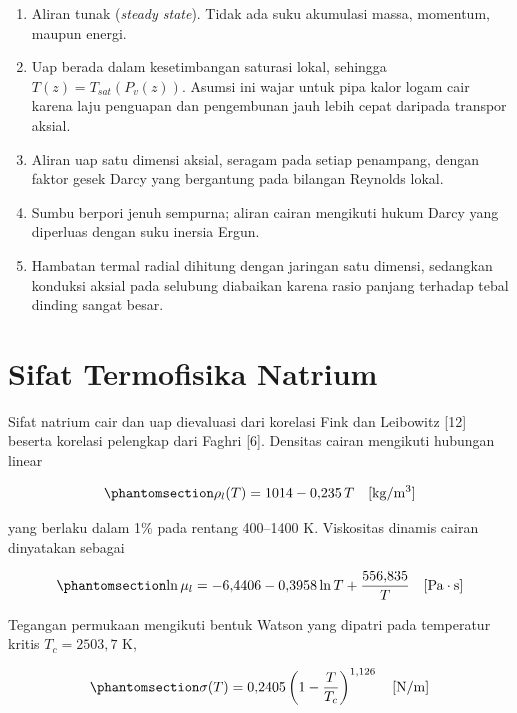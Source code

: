 \documentclass[
  indonesian,
  12pt,
  a4paper,
]{report}
\providecommand{\tightlist}{%
  \setlength{\itemsep}{0pt}\setlength{\parskip}{0pt}}
\begin{document}
\begin{enumerate}
\def\labelenumi{\arabic{enumi}.}
\tightlist
\item
  Aliran tunak (\emph{steady state}). Tidak ada suku akumulasi massa,
  momentum, maupun energi.
\item
  Uap berada dalam kesetimbangan saturasi lokal, sehingga
  \(T(z) = T_{sat}(P_v(z))\). Asumsi ini wajar untuk pipa kalor logam
  cair karena laju penguapan dan pengembunan jauh lebih cepat daripada
  transpor aksial.
\item
  Aliran uap satu dimensi aksial, seragam pada setiap penampang, dengan
  faktor gesek Darcy yang bergantung pada bilangan Reynolds lokal.
\item
  Sumbu berpori jenuh sempurna; aliran cairan mengikuti hukum Darcy yang
  diperluas dengan suku inersia Ergun.
\item
  Hambatan termal radial dihitung dengan jaringan satu dimensi,
  sedangkan konduksi aksial pada selubung diabaikan karena rasio panjang
  terhadap tebal dinding sangat besar.
\end{enumerate}

\section{Sifat Termofisika Natrium}\label{sifat-termofisika-natrium}

Sifat natrium cair dan uap dievaluasi dari korelasi Fink dan Leibowitz
{[}12{]} beserta korelasi pelengkap dari Faghri {[}6{]}. Densitas cairan
mengikuti hubungan linear

\begin{equation}\protect\phantomsection\label{eq-rhol}{\rho_l(T) = 1014 - 0{,}235\,T \quad [\mathrm{kg/m^3}]}\end{equation}

yang berlaku dalam 1\% pada rentang 400--1400 K. Viskositas dinamis
cairan dinyatakan sebagai

\begin{equation}\protect\phantomsection\label{eq-mul}{\ln \mu_l = -6{,}4406 - 0{,}3958 \ln T + \frac{556{,}835}{T} \quad [\mathrm{Pa\cdot s}]}\end{equation}

Tegangan permukaan mengikuti bentuk Watson yang dipatri pada temperatur
kritis \(T_c = 2503{,}7\) K,

\begin{equation}\protect\phantomsection\label{eq-sigma}{\sigma(T) = 0{,}2405 \left(1 - \frac{T}{T_c}\right)^{1{,}126} \quad [\mathrm{N/m}]}\end{equation}
\end{document}
